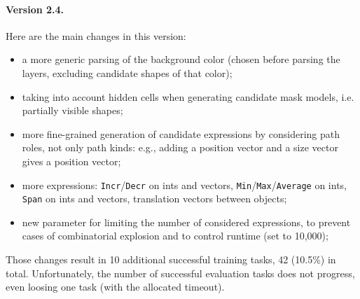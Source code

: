 \documentclass[a4paper]{llncs}
\begin{document}
\paragraph{Version 2.4.} Here are the main changes in this version:
\begin{itemize}
\item a more generic parsing of the background color (chosen before
  parsing the layers, excluding candidate shapes of that color);
\item taking into account hidden cells when generating candidate mask
  models, i.e. partially visible shapes;
\item more fine-grained generation of candidate expressions by
  considering path roles, not only path kinds: e.g., adding a position
  vector and a size vector gives a position vector;
\item more expressions: {\tt Incr}/{\tt Decr} on ints and vectors,
  {\tt Min}/{\tt Max}/{\tt Average} on ints, {\tt Span} on ints and
  vectors, translation vectors between objects;
\item new parameter for limiting the number of considered expressions,
  to prevent cases of combinatorial explosion and to control runtime
  (set to 10,000);
\end{itemize}
Those changes result in 10 additional successful training tasks, 42
(10.5\%) in total. Unfortunately, the number of successful evaluation
tasks does not progress, even loosing one task (with the allocated
timeout).
\end{document}
